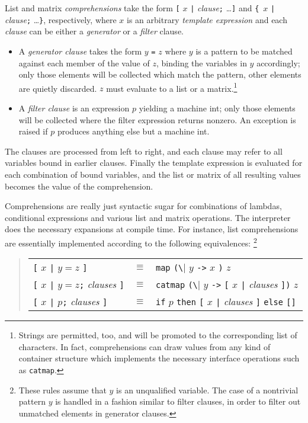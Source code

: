 \documentclass[a4paper,12pt]{article}
\newcommand{\nt}[1]{\textrm{\textit{#1\/}}}
\begin{document}
List and matrix \emph{comprehensions} take the form \verb|[| $x$ \verb?|? \nt{clause}\verb|;| \ldots \verb|]| and \verb|{|~$x$ \verb?|? \nt{clause}\verb|;| \ldots \verb|}|, respectively, where $x$ is an arbitrary \emph{template expression} and each \nt{clause} can be either a \emph{generator} or a \emph{filter} clause.

\begin{itemize}
\item  A \emph{generator clause} takes the form $y$ \verb|=| $z$ where $y$ is a pattern to be matched against each member of the value of $z$, binding the variables in $y$ accordingly; only those elements will be collected which match the pattern, other elements are quietly discarded. $z$ must evaluate to a list or a matrix.\footnote{Strings are permitted, too, and will be promoted to the corresponding list of characters. In fact, comprehensions can draw values from any kind of container structure which implements the necessary interface operations such as \texttt{catmap}.}
\item A \emph{filter clause} is an expression $p$ yielding a machine int; only those elements will be collected where the filter expression returns nonzero. An exception is raised if $p$ produces anything else but a machine int.
\end{itemize}

The clauses are processed from left to right, and each clause may refer to all variables bound in earlier clauses. Finally the template expression is evaluated for each combination of bound variables, and the list or matrix of all resulting values becomes the value of the comprehension.

Comprehensions are really just syntactic sugar for combinations of lambdas, conditional expressions and various list and matrix operations. The interpreter does the necessary expansions at compile time. For instance, list comprehensions are essentially implemented according to the following equivalences:%
\footnote{These rules assume that $y$ is an unqualified variable. The case of a nontrivial pattern $y$ is handled in a fashion similar to filter clauses, in order to filter out unmatched elements in generator clauses.}

\begin{quote}
\begin{tabular}{lcl}
  \verb|[| $x$ \verb?|? $y=z$ \verb|]| & $\equiv$ &
    \verb|map| \verb|(\| $y$ \verb|->| $x$ \verb|)| $z$\\
  \verb|[| $x$ \verb?|? $y=z$\verb|;| \nt{clauses} \verb|]| & $\equiv$ &
    \verb|catmap| \verb|(\| $y$ \verb|->| \verb|[| $x$ \verb?|? \nt{clauses} \verb|])| $z$\\
  \verb|[| $x$ \verb?|? $p$\verb|;| \nt{clauses} \verb|]| & $\equiv$ &
    \lstinline|if| $p$ \lstinline|then| \verb|[| $x$ \verb?|? \nt{clauses} \verb|]| \lstinline|else| \verb|[]|
\end{tabular}
\end{quote}
\end{document}
